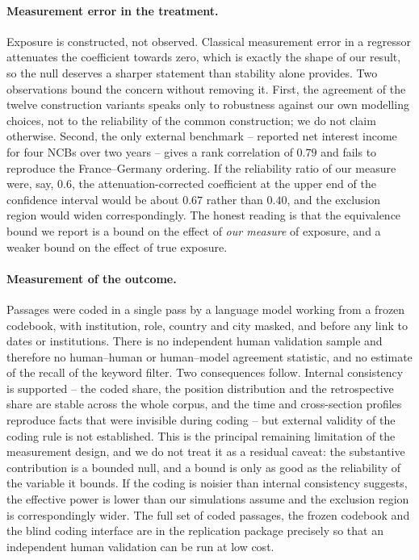 \documentclass[11pt]{article}
\theoremstyle{plain}
\begin{document}
\paragraph{Measurement error in the treatment.}
Exposure is constructed, not observed. Classical measurement error in a regressor attenuates the coefficient towards zero, which is exactly the shape of our result, so the null deserves a sharper statement than stability alone provides. Two observations bound the concern without removing it. First, the agreement of the twelve construction variants speaks only to robustness against our own modelling choices, not to the reliability of the common construction; we do not claim otherwise. Second, the only external benchmark -- reported net interest income for four NCBs over two years -- gives a rank correlation of $0.79$ and fails to reproduce the France--Germany ordering. If the reliability ratio of our measure were, say, $0.6$, the attenuation-corrected coefficient at the upper end of the confidence interval would be about $0.67$ rather than $0.40$, and the exclusion region would widen correspondingly. The honest reading is that the equivalence bound we report is a bound on the effect of \emph{our measure} of exposure, and a weaker bound on the effect of true exposure.

\paragraph{Measurement of the outcome.} Passages were coded in a single pass by a language model working from a frozen codebook, with institution, role, country and city masked, and before any link to dates or institutions. There is no independent human validation sample and therefore no human--human or human--model agreement statistic, and no estimate of the recall of the keyword filter. Two consequences follow. Internal consistency is supported -- the coded share, the position distribution and the retrospective share are stable across the whole corpus, and the time and cross-section profiles reproduce facts that were invisible during coding -- but external validity of the coding rule is not established. This is the principal remaining limitation of the measurement design, and we do not treat it as a residual caveat: the substantive contribution is a bounded null, and a bound is only as good as the reliability of the variable it bounds. If the coding is noisier than internal consistency suggests, the effective power is lower than our simulations assume and the exclusion region is correspondingly wider. The full set of coded passages, the frozen codebook and the blind coding interface are in the replication package precisely so that an independent human validation can be run at low cost.
\end{document}
